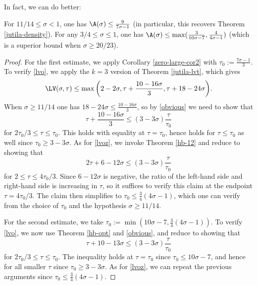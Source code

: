 In fact, we can do better:

\begin{theorem}\label{hb-density} \cite{heathbrown_zero_1979} For $11/14 \leq \sigma < 1$, one has $\A(\sigma) \leq \frac{9}{7\sigma - 1}$ (in particular, this recovers Theorem \ref{jutila-density}).  For any $3/4 \leq \sigma \leq 1$, one has $\A(\sigma) \leq \max(\frac{3}{10\sigma-7}, \frac{4}{4\sigma-1})$ (which is a superior bound when $\sigma \geq 20/23$).
\end{theorem}
\literature
{}
\derived
{}

\begin{proof} For the first estimate, we apply Corollary \ref{zero-large-cor2} with $\tau_0 := \frac{7\sigma-1}{3}$.  To verify \eqref{lvo}, we apply the $k=3$ version of Theorem \ref{jutila-lvt}, which gives
$$ \LV(\sigma,\tau) \leq \max \bigg( 2-2\sigma, \tau + \frac{10-16\sigma}{3}, \tau + 18-24\sigma \bigg).$$
When $\sigma \geq 11/14$ one has $18-24\sigma \leq \frac{10-16\sigma}{3}$, so by \eqref{obvious} we need to show that
$$ \tau + \frac{10-16\sigma}{3} \leq (3-3\sigma) \frac{\tau}{\tau_0}$$
for $2\tau_0/3 \leq \tau \leq \tau_0$.  This holds with equality at $\tau=\tau_0$, hence holds for $\tau \leq \tau_0$ as well since $\tau_0 \geq 3-3\sigma$.  As for \eqref{lvoz}, we invoke Theorem \ref{hb-12} and reduce to showing that
$$ 2\tau + 6 - 12\sigma \leq (3-3\sigma) \frac{\tau}{\tau_0}$$
for $2 \leq \tau \leq 4\tau_0/3$.  Since $6-12\sigma$ is negative, the ratio of the left-hand side and right-hand side is increasing in $\tau$, so it suffices to verify this claim at the endpoint $\tau = 4\tau_0/3$.  The claim then simplifies to $\tau_0 \leq \frac{3}{4} (4\sigma-1)$, which one can verify from the choice of $\tau_0$ and the hypothesis $\sigma \geq 11/14$.

For the second estimate, we take $\tau_0 := \min( 10\sigma-7, \frac{3}{4} (4\sigma-1))$.  To verify \eqref{lvo}, we now use Theorem \ref{hb-opt} and \eqref{obvious}, and reduce to showing that
$$ \tau + 10-13\sigma \leq (3-3\sigma) \frac{\tau}{\tau_0}$$
for $2\tau_0/3 \leq \tau \leq \tau_0$.  The inequality holds at $\tau=\tau_0$ since $\tau_0 \leq 10\sigma-7$, and hence for all smaller $\tau$ since $\tau_0 \geq 3-3\sigma$.  As for \eqref{lvoz}, we can repeat the previous arguments since $\tau_0 \leq \frac{3}{4} (4\sigma-1)$.
\end{proof}

